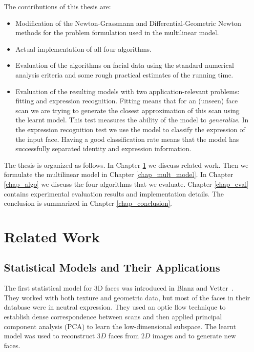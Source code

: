 The contributions of this thesis are:
\begin{itemize}
\item Modification of the Newton-Grassmann and Differential-Geometric Newton methods
for the problem formulation used in the multilinear model.
\item Actual implementation of all four algorithms.
\item Evaluation of the algorithms on facial data using the
standard numerical analysis criteria and some rough practical estimates of the running time.
\item Evaluation of the resulting models with two application-relevant
problems: fitting and expression recognition.
Fitting means that for an (unseen) face scan 
we are trying to generate the closest approximation
of this scan using the learnt model. This test measures
the ability of the model to \textit{generalize}.
In the expression recognition test we use the model
to classify the expression of the input face. Having a good
classification rate means that the model has successfully separated identity
and expression information.
\end{itemize}


The thesis is organized as follows. In Chapter \ref{rel_work}
we discuss related work. Then we formulate
the multilinear model in Chapter \ref{chap_mult_model}. 
In Chapter \ref{chap_algo} we discuss the four algorithms that we evaluate.
Chapter \ref{chap_eval} contains experimental evaluation results
and implementation details. The conclusion
is summarized in Chapter \ref{chap_conclusion}.


\chapter{Related Work}
\label{rel_work}


\section{Statistical Models and Their Applications}
The first statistical model for 3D faces
was introduced in Blanz and Vetter~\cite{BlanzVetter1999}. They worked with both texture and geometric data,
but most of the faces in their database were in neutral expression.
They used an optic flow technique to establish dense correspondence
between scans and then applied  principal
component analysis (PCA) to learn the low-dimensional subspace.
The learnt model was used to reconstruct $3D$ faces from $2D$ images
and to generate new faces. 



